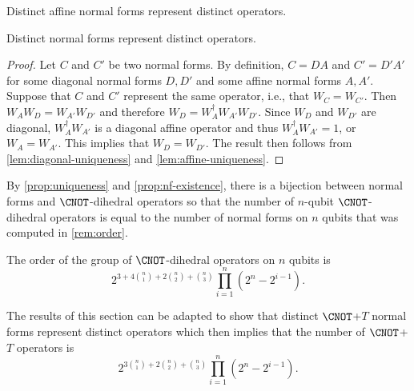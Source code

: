 \documentclass{eptcs}
\begin{document}
\begin{lemma}
  \label{lem:affine-uniqueness}
  Distinct affine normal forms represent distinct operators.
\end{lemma}

\begin{proposition}
  \label{prop:uniqueness}
  Distinct normal forms represent distinct operators.
\end{proposition}

\begin{proof}
  Let $C$ and $C'$ be two normal forms. By definition, $C=DA$ and
  $C'=D'A'$ for some diagonal normal forms $D,D'$ and some affine
  normal forms $A,A'$. Suppose that $C$ and $C'$ represent the same
  operator, i.e., that $W_C=W_{C'}$. Then $W_{A}W_{D} = W_{A'}W_{D'}$
  and therefore $W_{D} = W_{A}^\dagger W_{A'}W_{D'}$. Since $W_D$ and
  $W_{D'}$ are diagonal, $W_A^\dagger W_{A'}$ is a diagonal affine
  operator and thus $W_A^\dagger W_{A'}=1$, or $W_A=W_{A'}$. This
  implies that $W_D=W_{D'}$. The result then follows from
  \cref{lem:diagonal-uniqueness} and \cref{lem:affine-uniqueness}.
\end{proof}

By \cref{prop:uniqueness} and \cref{prop:nf-existence}, there is a
bijection between normal forms and $\CNOT$-dihedral operators so that
the number of $n$-qubit $\CNOT$-dihedral operators is equal to the
number of normal forms on $n$ qubits that was computed in
\cref{rem:order}.

\begin{corollary}
  \label{cor:cardinality}
  The order of the group of $\CNOT$-dihedral operators on $n$ qubits
  is
  \[
    2^{3 + 4\binom{n}{1} + 2\binom{n}{2} +
      \binom{n}{3}}\prod_{i=1}^{n} (2^n-2^{i-1}).
  \]
\end{corollary}

\begin{remark}
  \label{rem:cnott-uniqueness}
  The results of this section can be adapted to show that distinct
  $\CNOT$+$T$ normal forms represent distinct operators which then
  implies that the number of $\CNOT$+$T$ operators is
  \[
    2^{3\binom{n}{1} + 2\binom{n}{2} + \binom{n}{3}} \prod_{i=1}^{n}
    (2^n-2^{i-1}).
  \]
\end{remark}
\end{document}
